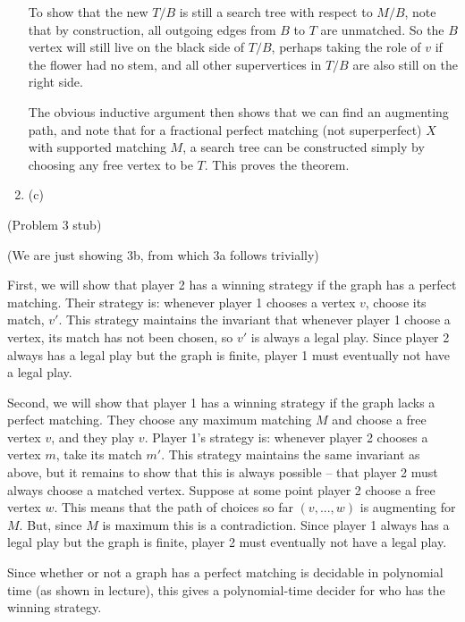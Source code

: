 \documentclass{hmcpset}
\begin{document}
\begin{solution}
\begin{enumerate}
To show that the new $T/B$ is still a search tree with respect to $M/B$, note that by construction, all outgoing edges from $B$ to $T$ are unmatched. So the $B$ vertex will still live on the black side of $T/B$, perhaps taking the role of $v$ if the flower had no stem, and all other supervertices in $T/B$ are also still on the right side.

The obvious inductive argument then shows that we can find an augmenting path, and note that for a fractional perfect matching (not superperfect) $X$ with supported matching $M$, a search tree can be constructed simply by choosing any free vertex to be $T$. This proves the theorem.

\item (c)
\end{enumerate}
\end{solution}
\begin{problem}[3]
(Problem 3 stub)
\end{problem}
\begin{solution}
(We are just showing 3b, from which 3a follows trivially)

First, we will show that player 2 has a winning strategy if the graph has a perfect matching. Their strategy is: whenever player 1 chooses a vertex $v$, choose its match, $v'$. This strategy maintains the invariant that whenever player 1 choose a vertex, its match has not been chosen, so $v'$ is always a legal play. Since player 2 always has a legal play but the graph is finite, player 1 must eventually not have a legal play.

Second, we will show that player 1 has a winning strategy if the graph lacks a perfect matching. They choose any maximum matching $M$ and choose a free vertex $v$, and they play $v$. Player 1's strategy is: whenever player 2 chooses a vertex $m$, take its match $m'$. This strategy maintains the same invariant as above, but it remains to show that this is always possible -- that player 2 must always choose a matched vertex. Suppose at some point player 2 choose a free vertex $w$. This means that the path of choices so far $(v,...,w)$ is augmenting for $M$. But, since $M$ is maximum this is a contradiction. Since player 1 always has a legal play but the graph is finite, player 2 must eventually not have a legal play.

Since whether or not a graph has a perfect matching is decidable in polynomial time (as shown in lecture), this gives a polynomial-time decider for who has the winning strategy.

\end{solution}
\end{document}
